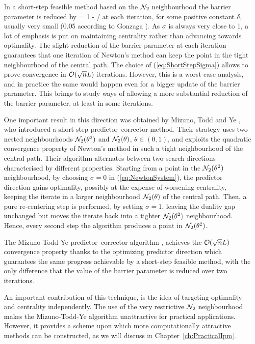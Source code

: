 In a short-step feasible method based on the $\mathcal{N}_2$ neighbourhood
the barrier parameter is reduced by 
\be  \label{eq:ShortStepSigma}
   \sigma = 1 - \delta/
\ee
at each iteration, for some positive constant $\delta$, usually
very small (0.05 according to Gonzaga \cite{Gonzaga91a}).
As $\sigma$ is always very close to 1, a lot of emphasis is put 
on maintaining centrality rather than advancing towards optimality. 
%
The slight reduction of the barrier parameter at
each iteration guarantees that one iteration of Newton's
method can keep the point in the tight neighbourhood of the central path.
The choice of (\ref{eq:ShortStepSigma}) allows to prove convergence
in $\mathcal{O}(\sqrt{n}L)$ iterations.
However, this is a worst-case analysis, and in practice the same would happen
even for a bigger update of the barrier parameter. This brings to
study ways of allowing a more substantial reduction of the barrier
parameter, at least in some iterations. 

One important result in this direction was obtained by 
Mizuno, Todd and Ye \cite{MizunoToddYe}, who introduced a short-step 
predictor--corrector method. Their strategy uses two nested neighbourhoods 
$\mathcal{N}_2(\theta^2)$ and $\mathcal{N}_2(\theta)$, $\theta \in (0,1)$, 
and exploits the
quadratic convergence property of Newton's method in such a tight
neighbourhood of the central path.
Their algorithm alternates between two search directions characterised by
different properties.
Starting from a point in the $\mathcal{N}_2(\theta^2)$ neighbourhood,
by choosing $\sigma = 0$ in (\ref{eq:NewtonSystem}),
the predictor direction gains optimality, possibly at the expense of
worsening centrality, keeping the iterate in a larger neighbourhood
$\mathcal{N}_2(\theta)$ of the central path. 
Then, a pure re-centering step is performed, by setting $\sigma = 1$,
leaving the duality gap unchanged but moves the iterate back into a 
tighter $\mathcal{N}_2(\theta^2)$ neighbourhood. Hence, every second step the 
algorithm produces a point in $\mathcal{N}_2(\theta^2)$.

The Mizuno-Todd-Ye predictor--corrector algorithm \cite{MizunoToddYe},
achieves the $\mathcal{O}(\sqrt{n}L)$ convergence property
thanks to the optimizing predictor
direction which guarantees the same progress achievable by a short-step 
feasible method, with the only 
difference that the value of the barrier parameter is reduced over
two iterations.

An important contribution of this technique, is the idea 
of targeting optimality and centrality independently. 
The use of the very restrictive $\mathcal{N}_2$ neighbourhood 
makes the Mizuno-Todd-Ye algorithm unattractive for practical applications.
However, it provides a scheme 
upon which more computationally attractive methods can be constructed,
as we will discuss in Chapter~\ref{ch:PracticalIpm}.


